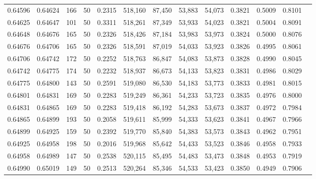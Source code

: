\begin{tabular}{rrrrrrrrrrrrr}
0.64596 & 0.64624 &   166 &  50 &                                     0.2315 & 518,160 &  87,450 &  53,883 &  54,073 & 0.3821 & 0.5009 & 0.8101 \\
0.64625 & 0.64647 &   101 &  50 &                                     0.3311 & 518,261 &  87,349 &  53,933 &  54,023 & 0.3821 & 0.5004 & 0.8091 \\
0.64648 & 0.64676 &   165 &  50 &                                     0.2326 & 518,426 &  87,184 &  53,983 &  53,973 & 0.3824 & 0.5000 & 0.8076 \\
0.64676 & 0.64706 &   165 &  50 &                                     0.2326 & 518,591 &  87,019 &  54,033 &  53,923 & 0.3826 & 0.4995 & 0.8061 \\
0.64706 & 0.64742 &   172 &  50 &                                     0.2252 & 518,763 &  86,847 &  54,083 &  53,873 & 0.3828 & 0.4990 & 0.8045 \\
0.64742 & 0.64775 &   174 &  50 &                                     0.2232 & 518,937 &  86,673 &  54,133 &  53,823 & 0.3831 & 0.4986 & 0.8029 \\
0.64775 & 0.64800 &   143 &  50 &                                     0.2591 & 519,080 &  86,530 &  54,183 &  53,773 & 0.3833 & 0.4981 & 0.8015 \\
0.64801 & 0.64831 &   169 &  50 &                                     0.2283 & 519,249 &  86,361 &  54,233 &  53,723 & 0.3835 & 0.4976 & 0.8000 \\
0.64831 & 0.64865 &   169 &  50 &                                     0.2283 & 519,418 &  86,192 &  54,283 &  53,673 & 0.3837 & 0.4972 & 0.7984 \\
0.64865 & 0.64899 &   193 &  50 &                                     0.2058 & 519,611 &  85,999 &  54,333 &  53,623 & 0.3841 & 0.4967 & 0.7966 \\
0.64899 & 0.64925 &   159 &  50 &                                     0.2392 & 519,770 &  85,840 &  54,383 &  53,573 & 0.3843 & 0.4962 & 0.7951 \\
0.64925 & 0.64958 &   198 &  50 &                                     0.2016 & 519,968 &  85,642 &  54,433 &  53,523 & 0.3846 & 0.4958 & 0.7933 \\
0.64958 & 0.64989 &   147 &  50 &                                     0.2538 & 520,115 &  85,495 &  54,483 &  53,473 & 0.3848 & 0.4953 & 0.7919 \\
0.64990 & 0.65019 &   149 &  50 &                                     0.2513 & 520,264 &  85,346 &  54,533 &  53,423 & 0.3850 & 0.4949 & 0.7906 \\

\end{tabular}
